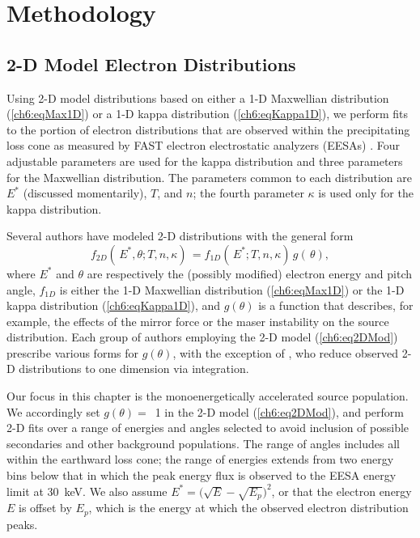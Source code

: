   \section{Methodology}

  \subsection{2-D Model Electron Distributions} \label{ss2D}

  Using 2-D model distributions based on either a 1-D Maxwellian distribution
  (\ref{ch6:eqMax1D}) or a 1-D kappa distribution (\ref{ch6:eqKappa1D}), we
  perform fits to the portion of electron distributions that are observed within
  the precipitating loss cone as measured by FAST electron electrostatic
  analyzers (EESAs) \citep{Carlson2001}. Four adjustable parameters are used for
  the kappa distribution and three parameters for the Maxwellian
  distribution. The parameters common to each distribution are $E^*$ (discussed
  momentarily), $T$, and $n$; the fourth parameter $\kappa$ is used only for the
  kappa distribution.

  Several authors \citep{Maggs1981,Bingham1999,Bingham2000,Mutel2007} have
  modeled 2-D distributions with the general form
    \begin{equation} \label{ch6:eq2DMod} f_{2D}(\, E^*, \theta ; T, n,
      \kappa) \, = f_{1D}(\, E^*; T, n, \kappa) \, g(\, \theta),
    \end{equation}
  where $E^*$ and $\theta$ are respectively the (possibly modified) electron
  energy and pitch angle, $f_{1D}$ is either the 1-D Maxwellian distribution
  (\ref{ch6:eqMax1D}) or the 1-D kappa distribution (\ref{ch6:eqKappa1D}), and
  $g(\theta )$ is a function that describes, for example, the effects of the
  mirror force or the maser instability on the source distribution. Each group
  of authors employing the 2-D model (\ref{ch6:eq2DMod}) prescribe various forms
  for $g(\theta)$, with the exception of \citet{Pritchett1999}, who reduce
  observed 2-D distributions to one dimension via integration.

  Our focus in this chapter is the monoenergetically accelerated source
  population. We accordingly set $g(\theta) =$~1 in the 2-D model
  (\ref{ch6:eq2DMod}), and perform 2-D fits over a range of energies and angles
  selected to avoid inclusion of possible secondaries and other background
  populations. The range of angles includes all within the earthward loss cone;
  the range of energies extends from two energy bins below that in which the
  peak energy flux is observed to the EESA energy limit at 30~keV. We also
  assume $E^* = \big( \sqrt{E} - \sqrt{E_p} \big)^2$, or that the electron
  energy $E$ is offset by $E_p$, which is the energy at which the observed
  electron distribution peaks.

